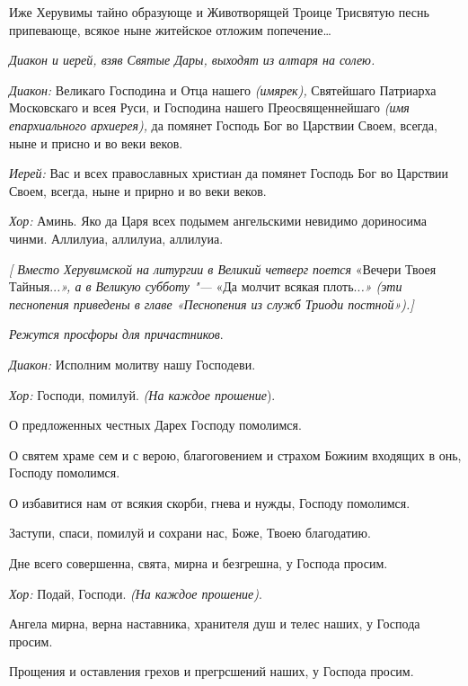 \begin{mymulticols}


  Иже Херувимы тайно образующе и Животворящей Троице Трисвятую песнь припевающе, всякое ныне житейское отложим попечение… 




 {\itshape Диакон и иерей, взяв Святые Дары, выходят из алтаря на солею.}


 {\itshape Диакон:} Великаго Господина и Отца нашего  {\itshape (имярек),} Святейшаго Патриарха Московскаго и всея Руси, и Господина нашего Преосвященнейшаго {\itshape (имя епархиального архиерея),} да помянет Господь Бог во Царствии Своем, всегда, ныне и присно и во веки веков.


 {\itshape Иерей:} Вас и всех православных христиан да помянет Господь Бог во Царствии Своем, всегда, ныне и прирно и во веки веков.


{\itshape Хор:} Аминь. Яко да Царя всех подымем ангельскими невидимо дориносима чинми. Аллилуиа, аллилуиа, аллилуиа.


  {\itshape [ Вместо Херувимской на литургии в Великий четверг поется }«Вечери Твоея Тайныя..{\itshape .», а в Великую субботу "--- }«Да молчит всякая плоть..{\itshape .» (эти песнопения приведены в главе «Песнопения из служб Триоди постной»).]}



 {\itshape Режутся просфоры для причастников}. 




 {\itshape Диакон:} Исполним молитву нашу Господеви. 

{\itshape Хор:} Господи, помилуй. {\itshape (На каждое прошение}). 


  О предложенных честных Дарех Господу помолимся. 


  О святем храме сем и с верою, благоговением и страхом Божиим входящих в онь, Господу помолимся. 


  О избавитися нам от всякия скорби, гнева и нужды, Господу помолимся. 


  Заступи, спаси, помилуй и сохрани нас, Боже, Твоею благодатию. 


  Дне всего совершенна, свята, мирна и безгрешна, у Господа просим. 

{\itshape Хор:} Подай, Господи. {\itshape (На каждое прошение)}. 


  Ангела мирна, верна наставника, хранителя душ и телес наших, у Господа просим. 


  Прощения и оставления грехов и прегрсшений наших, у Господа просим. 



\end{mymulticols}
